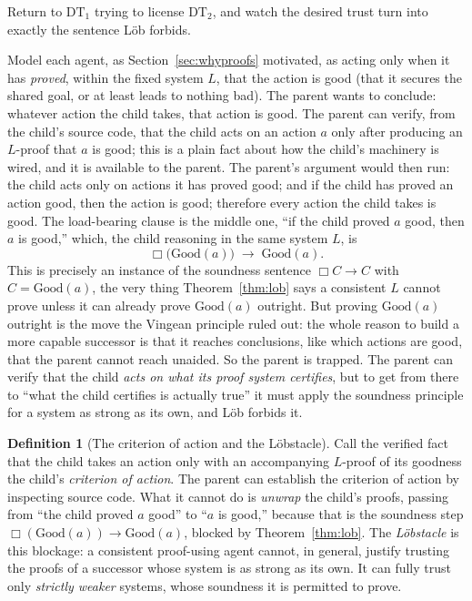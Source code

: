 \documentclass[10pt]{article}
\theoremstyle{definition}
\newtheorem{definition}[theorem]{Definition}
\theoremstyle{remark}
\newcommand{\Prov}{\Box}              %
\newcommand{\good}{\mathrm{Good}}
\begin{document}
Return to $\mathrm{DT}_1$ trying to license $\mathrm{DT}_2$, and watch the desired trust turn into exactly the sentence L\"ob forbids.

Model each agent, as Section~\ref{sec:whyproofs} motivated, as acting only when it has \emph{proved}, within the fixed system $L$, that the action is good (that it secures the shared goal, or at least leads to nothing bad). The parent wants to conclude: whatever action the child takes, that action is good. The parent can verify, from the child's source code, that the child acts on an action $a$ only after producing an $L$-proof that $a$ is good; this is a plain fact about how the child's machinery is wired, and it is available to the parent. The parent's argument would then run: the child acts only on actions it has proved good; and if the child has proved an action good, then the action is good; therefore every action the child takes is good. The load-bearing clause is the middle one, ``if the child proved $a$ good, then $a$ is good,'' which, the child reasoning in the same system $L$, is
\[
\Prov\big(\good(a)\big) \;\to\; \good(a).
\]
This is precisely an instance of the soundness sentence $\Prov C \to C$ with $C = \good(a)$, the very thing Theorem~\ref{thm:lob} says a consistent $L$ cannot prove unless it can already prove $\good(a)$ outright. But proving $\good(a)$ outright is the move the Vingean principle ruled out: the whole reason to build a more capable successor is that it reaches conclusions, like which actions are good, that the parent cannot reach unaided. So the parent is trapped. The parent can verify that the child \emph{acts on what its proof system certifies}, but to get from there to ``what the child certifies is actually true'' it must apply the soundness principle for a system as strong as its own, and L\"ob forbids it.

\begin{definition}[The criterion of action and the L\"obstacle]
\label{def:lobstacle}
Call the verified fact that the child takes an action only with an accompanying $L$-proof of its goodness the child's \emph{criterion of action}. The parent can establish the criterion of action by inspecting source code. What it cannot do is \emph{unwrap} the child's proofs, passing from ``the child proved $a$ good'' to ``$a$ is good,'' because that is the soundness step $\Prov(\good(a)) \to \good(a)$, blocked by Theorem~\ref{thm:lob}. The \emph{L\"obstacle} is this blockage: a consistent proof-using agent cannot, in general, justify trusting the proofs of a successor whose system is as strong as its own. It can fully trust only \emph{strictly weaker} systems, whose soundness it is permitted to prove.
\end{definition}
\end{document}
